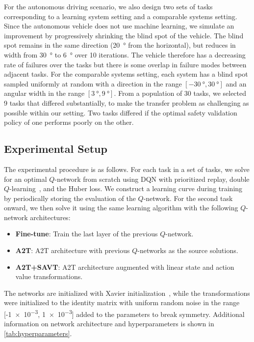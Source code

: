 For the autonomous driving scenario, we also design two sets of tasks corresponding to a learning system setting and a comparable systems setting. Since the autonomous vehicle does not use machine learning, we simulate an improvement by progressively shrinking the blind spot of the vehicle. The blind spot remains in the same direction (\SI{20}{\degree} from the horizontal), but reduces in width from \SI{30}{\degree} to \SI{6}{\degree} over \num{10} iterations. The vehicle therefore has a decreasing rate of failures over the tasks but there is some overlap in failure modes between adjacent tasks. For the comparable systems setting, each system has a blind spot sampled uniformly at random with a direction in the range $[\SI{-30}{\degree}, \SI{30}{\degree}]$ and an angular width in the range $[\SI{3}{\degree}, \SI{9}{\degree}]$. From a population of \num{30} tasks, we selected \num{9} tasks that differed substantially, to make the transfer problem as challenging as possible within our setting. Two tasks differed if the optimal safety validation policy of one performs poorly on the other. 


\subsection{Experimental Setup}

The experimental procedure is as follows. For each task in a set of tasks, we solve for an optimal $Q$-network from scratch using DQN with prioritized replay, double $Q$-learning~\cite{Hasselt2016deep}, and the Huber loss. We construct a learning curve during training by periodically storing the evaluation of the $Q$-network. For the second task onward, we then solve it using the same learning algorithm with the following $Q$-network  architectures:
\begin{itemize}
    \item \textbf{Fine-tune}: Train the last layer of the previous $Q$-network.
    \item \textbf{A2T}: A2T architecture with previous $Q$-networks as the source solutions.
    \item \textbf{A2T+SAVT}:  A2T architecture augmented with linear state and action value transformations.
\end{itemize}
The networks are initialized with Xavier initialization~\cite{glorot2010understanding}, while the transformations were initialized to the identity matrix with uniform random noise  in the range [-\num{1e-3}, \num{1e-3}] added to the parameters to break symmetry. Additional information on network architecture and hyperparameters is shown in \cref{tab:hyperparameters}.


